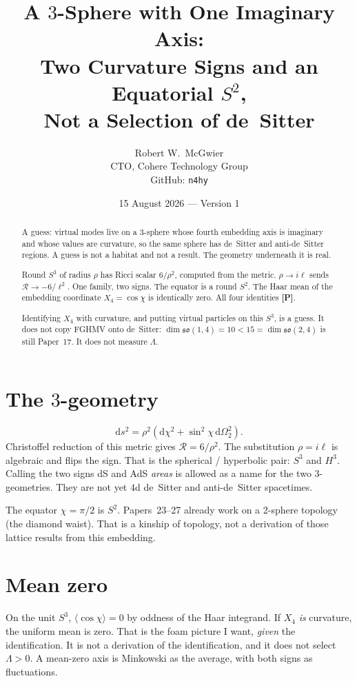 \documentclass[11pt]{article}
\title{\textbf{A $3$-Sphere with One Imaginary Axis:\\
Two Curvature Signs and an Equatorial $S^2$,\\
Not a Selection of de~Sitter}}
\author{Robert W.\ McGwier\\
\small CTO, Cohere Technology Group\\
\small GitHub: \texttt{n4hy}}
\date{15 August 2026 --- Version 1}
\newcommand{\pP}{\textbf{[P]}}
\begin{document}
\maketitle

\begin{abstract}
\noindent
A guess: virtual modes live on a $3$-sphere whose fourth
embedding axis is imaginary and whose values are curvature, so
the same sphere has de~Sitter and anti-de~Sitter regions. A
guess is not a habitat and not a result. The geometry underneath
it is real.

Round $S^3$ of radius $\rho$ has Ricci scalar $6/\rho^2$,
computed from the metric. $\rho\to i\ell$ sends
$\mathcal{R}\to-6/\ell^2$. One family, two signs. The equator
is a round $S^2$. The Haar mean of the embedding coordinate
$X_4=\cos\chi$ is identically zero. All four identities \pP{}.

Identifying $X_4$ with curvature, and putting virtual particles
on this $S^3$, is a guess. It does not copy FGHMV onto
de~Sitter: $\dim\mathfrak{so}(1,4)=10<15=\dim\mathfrak{so}(2,4)$
is still Paper~17. It does not measure $\Lambda$.
\end{abstract}

\section{The $3$-geometry}

\[
\mathrm{d}s^2=\rho^2(\mathrm{d}\chi^2+\sin^2\chi\,\mathrm{d}\Omega_2^2).
\]
Christoffel reduction of this metric gives $\mathcal{R}=6/\rho^2$.
The substitution $\rho=i\ell$ is algebraic and flips the sign.
That is the spherical / hyperbolic pair: $S^3$ and $H^3$.
Calling the two signs dS and AdS \emph{areas} is allowed as a
name for the two 3-geometries. They are not yet $4$d de~Sitter
and anti-de~Sitter spacetimes.

The equator $\chi=\pi/2$ is $S^2$. Papers~23--27 already work
on a 2-sphere topology (the diamond waist). That is a kinship
of topology, not a derivation of those lattice results from
this embedding.

\section{Mean zero}

On the unit $S^3$, $\langle\cos\chi\rangle=0$ by oddness of the
Haar integrand. If $X_4$ \emph{is} curvature, the uniform mean
is zero. That is the foam picture I want, \emph{given} the
identification. It is not a derivation of the identification,
and it does not select $\Lambda>0$. A mean-zero axis is
Minkowski as the average, with both signs as fluctuations.
\end{document}

